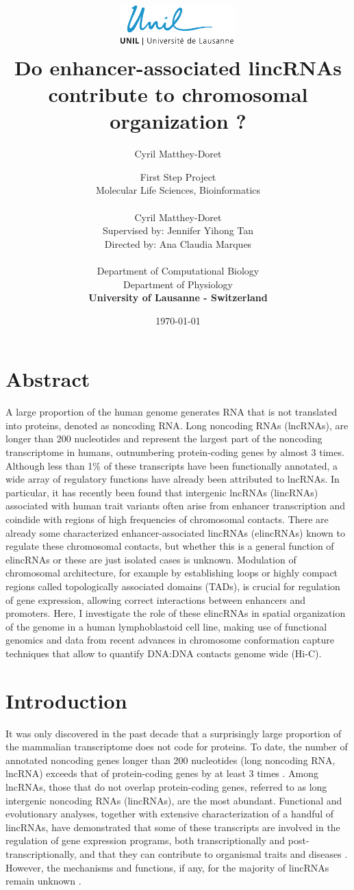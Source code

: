 \documentclass[11pt,a4paper]{report}
\author{Cyril Matthey-Doret}
\title{
\includegraphics[width=1.75in]{lo_unil06_bleu.pdf} \\
\vspace*{1in}
\textbf{Do enhancer-associated lincRNAs contribute to chromosomal organization ?}}
\author{\Large{First Step Project}\\
		Molecular Life Sciences, Bioinformatics\\
				\vspace*{0.5in} \\
		Cyril Matthey-Doret\\
        Supervised by: Jennifer Yihong Tan\\
        Directed by: Ana Claudia Marques\\
		\vspace*{0.5in} \\
		Department of Computational Biology\\
		Department of Physiology\\
        \textbf{University of Lausanne - Switzerland}\\
       } \date{\today}
\begin{document}
\renewcommand{\headrulewidth}{1pt}
\maketitle

\section*{Abstract}

A large proportion of the human genome generates RNA that is not translated into proteins, denoted as noncoding RNA. Long noncoding RNAs (lncRNAs), are longer than 200 nucleotides and represent the largest part of the noncoding transcriptome in humans, outnumbering protein-coding genes by almost 3 times. Although less than 1\% of these transcripts have been functionally annotated, a wide array of regulatory functions have already been attributed to lncRNAs. In particular, it has recently been found that intergenic lncRNAs (lincRNAs) associated with human trait variants often arise from enhancer transcription and coindide with regions of high frequencies of chromosomal contacts. There are already some characterized enhancer-associated lincRNAs (elincRNAs) known to regulate these chromosomal contacts, but whether this is a general function of elincRNAs or these are just isolated cases is unknown. Modulation of chromosomal architecture, for example by establishing loops or highly compact regions called topologically associated domains (TADs), is crucial for regulation of gene expression, allowing correct interactions between enhancers and promoters. Here, I investigate the role of these elincRNAs in spatial organization of the genome in a human lymphoblastoid cell line, making use of functional genomics and data from recent advances in chromosome conformation capture techniques that allow to quantify DNA:DNA contacts genome wide (Hi-C).

\section*{Introduction}
It was only discovered in the past decade that a surprisingly large proportion of the mammalian transcriptome does not code for proteins. To date, the number of annotated noncoding genes longer than 200 nucleotides (long noncoding RNA, lncRNA) exceeds that of protein-coding genes by at least 3 times \cite{Iyer2015}⁠. Among lncRNAs, those that do not overlap protein-coding genes, referred to as long intergenic noncoding RNAs (lincRNAs), are the most abundant. Functional and evolutionary analyses, together with extensive characterization of a handful of lincRNAs, have demonstrated that some of these transcripts are involved in the regulation of gene expression programs, both transcriptionally and post-transcriptionally, and that they can contribute to organismal traits and diseases \cite{Kornienko2013}⁠. However, the mechanisms and functions, if any, for the majority of lincRNAs remain unknown \cite{Rinn2012}⁠.  
\end{document}
